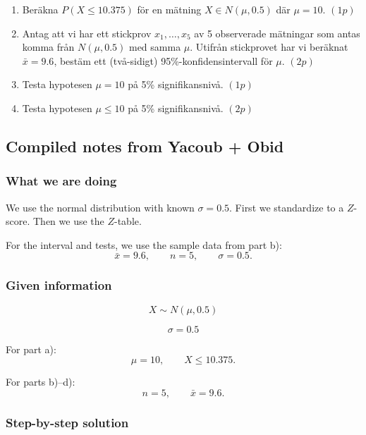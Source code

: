 \documentclass[10pt]{article}
\begin{document}
\begin{enumerate}[label=\alph*)]
\item Beräkna \(P(X \le 10.375)\) för en mätning
\(X \in N(\mu,0.5)\) där \(\mu = 10\). \((1p)\)

\item Antag att vi har ett stickprov
\(x_1,\ldots,x_5\) av 5 observerade mätningar som
antas komma från \(N(\mu,0.5)\) med samma \(\mu\).
Utifrån stickprovet har vi beräknat \(\bar{x}=9.6\),
bestäm ett (två-sidigt) 95\%-konfidensintervall
för \(\mu\). \((2p)\)

\item Testa hypotesen \(\mu = 10\) på
5\% signifikansnivå. \((1p)\)

\item Testa hypotesen \(\mu \le 10\) på
5\% signifikansnivå. \((2p)\)
\end{enumerate}

\subsection*{Compiled notes from Yacoub + Obid}

\subsubsection*{What we are doing}

We use the normal distribution with known
\(\sigma=0.5\). First we standardize to a
\(Z\)-score. Then we use the \(Z\)-table.

For the interval and tests, we use the sample data
from part b):
\[
\bar{x}=9.6,\qquad n=5,\qquad \sigma=0.5.
\]

\subsubsection*{Given information}

\[
X \sim N(\mu,0.5)
\]

\[
\sigma = 0.5
\]

For part a):
\[
\mu = 10,
\qquad
X \le 10.375.
\]

For parts b)--d):
\[
n=5,
\qquad
\bar{x}=9.6.
\]

\subsubsection*{Step-by-step solution}
\end{document}
